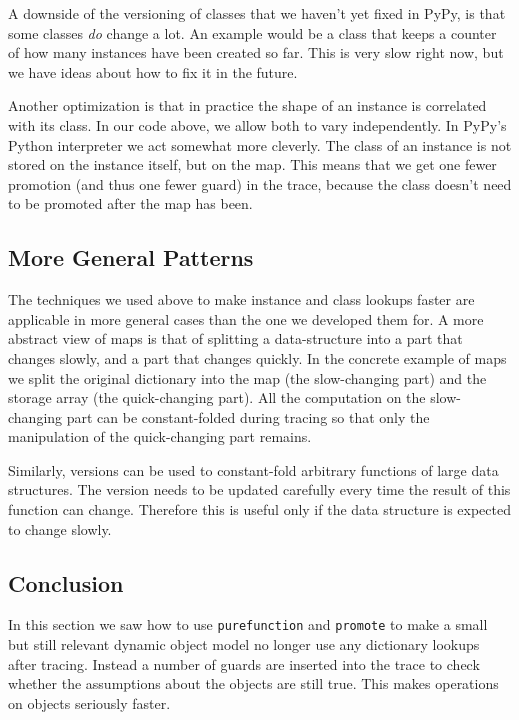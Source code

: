 \documentclass{sig-alternate}
\begin{document}
A downside of the versioning of classes that we haven't yet fixed in PyPy, is
that some classes \emph{do} change a lot. An example would be a class that keeps a
counter of how many instances have been created so far. This is very slow right
now, but we have ideas about how to fix it in the future.

Another optimization is that in practice the shape of an instance is correlated
with its class. In our code above, we allow both to vary independently.
In PyPy's Python interpreter we act somewhat more cleverly. The class of
an instance is not stored on the instance itself, but on the map. This means
that we get one fewer promotion (and thus one fewer guard) in the trace, because the class doesn't need to
be promoted after the map has been.



\subsection{More General Patterns}

The techniques we used above to make instance and class lookups faster are
applicable in more general cases than the one we developed them for. A more
abstract view of maps is that of splitting a data-structure into a part that
changes slowly, and a part that changes quickly. In the concrete example of maps
we split the original dictionary into the map (the slow-changing part) and the
storage array (the quick-changing part). All the computation on the
slow-changing part can be constant-folded during tracing so that only the
manipulation of the quick-changing part remains.

Similarly, versions can be used to constant-fold arbitrary functions of large data
structures. The version needs to be updated carefully every time the result of
this function can change. Therefore this is useful only if the data structure is
expected to change slowly.



\subsection{Conclusion}

In this section we saw how to use \texttt{purefunction} and \texttt{promote} to make a
small but still relevant dynamic object model no longer use any dictionary lookups
after tracing. Instead a number of guards are inserted into the
trace to check whether the assumptions about the objects are still true. This
makes operations on objects seriously faster.
\end{document}
